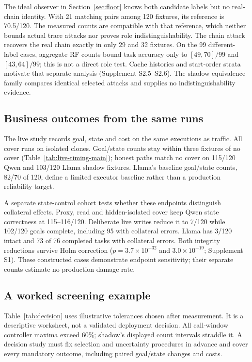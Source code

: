 The ideal observer in Section~\ref{sec:floor} knows both candidate labels but no real-chain identity. With 21 matching pairs among 120 fixtures, its reference is 70.5/120. The measured counts are compatible with that reference, which neither bounds actual trace attacks nor proves role indistinguishability. The chain attack recovers the real chain exactly in only 29 and 32 fixtures. On the 99 different-label cases, aggregate RF counts bound task accuracy only to $[49,70]/99$ and $[43,64]/99$; this is not a direct role test. Cache histories and start-order strata motivate that separate analysis (Supplement S2.5--S2.6). The shadow equivalence family compares identical selected attacks and supplies no indistinguishability evidence.

\subsection{Business outcomes from the same runs}\label{sec:state}
The live study records goal, state and cost on the same executions as traffic. All cover runs on isolated clones. Goal/state counts stay within three fixtures of no cover (Table~\ref{tab:live-timing-main}); honest paths match no cover on 115/120 Qwen and 103/120 Llama shadow fixtures. Llama's baseline goal/state counts, 82/70 of 120, define a limited executor baseline rather than a production reliability target.

A separate state-control cohort tests whether these endpoints distinguish collateral effects. Proxy, read and hidden-isolated cover keep Qwen state correctness at 115--116/120. Deliberate live writes reduce it to 7/120 while 102/120 goals complete, including 95 with collateral errors. Llama has 3/120 intact and 73 of 76 completed tasks with collateral errors. Both integrity reductions survive Holm correction ($p=3.7\times10^{-32}$ and $3.0\times10^{-19}$; Supplement S1). These constructed cases demonstrate endpoint sensitivity; their separate counts estimate no production damage rate.

\subsection{A worked screening example}\label{sec:decision}
Table~\ref{tab:decision} uses illustrative tolerances chosen after measurement. It is a descriptive worksheet, not a validated deployment decision. All call-window controller maxima exceed 60\%; shadow's displayed count intervals straddle it. A decision study must fix selection and uncertainty procedures in advance and cover every mandatory outcome, including paired goal/state changes and costs.


